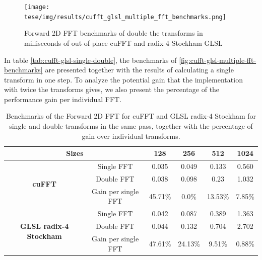 \documentclass[
  oneside,
  11pt, a4paper,
  footinclude=true,
  headinclude=true,
  cleardoublepage=empty
]{scrbook}
\begin{document}
\begin{figure}[H] 
    \centering
    \texttt{[image: tese/img/results/cufft\_glsl\_multiple\_fft\_benchmarks.png]}
    \caption{Forward 2D FFT benchmarks of double the transforms in milliseconds of out-of-place cuFFT and radix-4 Stockham GLSL}
    \label{fig:cufft-glsl-multiple-fft-benchmarks}
\end{figure}


In table \autoref{tab:cufft-glsl-single-double}, the benchmarks of \autoref{fig:cufft-glsl-multiple-fft-benchmarks} are presented together with the results of calculating a single transform in one step. To analyze the potential gain that the implementation with twice the transforms gives, we also present the percentage of the performance gain per individual FFT.


\begin{table}[H]
    \centering
    \begin{tabular}{|cc|c|c|c|c|}
    \hline
    \multicolumn{2}{|c|}{\textbf{Sizes}}                                                        & \textbf{128}     & \textbf{256}     & \textbf{512}     & \textbf{1024}   \\ \hline
    \multicolumn{1}{|c|}{\multirow{3}{*}{\textbf{cuFFT}}}                 & Single FFT          & 0.035   & 0.049   & 0.133   & 0.560  \\ \cline{2-6} 
    \multicolumn{1}{|c|}{}                                                & Double FFT          & 0.038   & 0.098   & 0.23    & 1.032  \\ \cline{2-6} 
    \multicolumn{1}{|c|}{}                                                & Gain per single FFT & 45.71\% & 0.0\%   & 13.53\% & 7.85\% \\ \hline
    \multicolumn{1}{|c|}{\multirow{3}{*}{\textbf{GLSL radix-4 Stockham}}} & Single FFT          & 0.042   & 0.087   & 0.389   & 1.363  \\ \cline{2-6} 
    \multicolumn{1}{|c|}{}                                                & Double FFT          & 0.044   & 0.132   & 0.704   & 2.702  \\ \cline{2-6} 
    \multicolumn{1}{|c|}{}                                                & Gain per single FFT & 47.61\% & 24.13\% & 9.51\%  & 0.88\% \\ \hline
    \end{tabular}
    \caption{Benchmarks of the Forward 2D FFT for cuFFT and GLSL radix-4 Stockham for single and double transforms in the same pass, together with the percentage of gain over individual transforms.}
    \label{tab:cufft-glsl-single-double}
\end{table}
\end{document}
